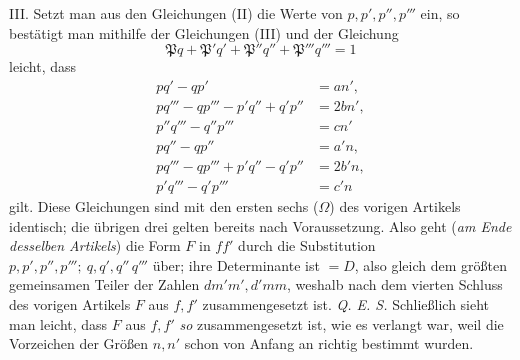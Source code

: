 III. Setzt man aus den Gleichungen (II) die Werte von $p,p',p'',p'''$ ein, so bestätigt man mithilfe der Gleichungen (III) und der Gleichung
\[
\mathfrak{P}q+\mathfrak{P}'q'+\mathfrak{P}''q''+\mathfrak{P}'''q'''=1
\]
leicht, dass
\[
\begin{aligned}
pq'-qp'&=an',\\ pq'''-qp'''-p'q''+q'p''&=2bn',\\p''q'''-q''p'''&=cn'\\
pq''-qp''&=a'n,\\ pq'''-qp'''+p'q''-q'p''&=2b'n,\\p'q'''-q'p'''&=c'n
\end{aligned}
\]
gilt. Diese Gleichungen sind mit den ersten sechs ($\Omega$) des vorigen Artikels identisch; die übrigen drei gelten bereits nach Voraussetzung. Also geht (\textit{am Ende desselben Artikels}) die Form $F$ in $ff'$ durch die Substitution $p,p',p'',p''';\ q,q',q''\,q'''$ über; ihre Determinante ist $=D$, also gleich dem größten gemeinsamen Teiler der Zahlen $dm'm',d'mm$, weshalb nach dem vierten Schluss des vorigen Artikels $F$ aus $f,f'$ zusammengesetzt ist. \textit{Q. E. S.} Schließlich sieht man leicht, dass $F$ aus $f,f'$ \textit{so} zusammengesetzt ist, wie es verlangt war, weil die Vorzeichen der Größen $n,n'$ schon von Anfang an richtig bestimmt wurden.
